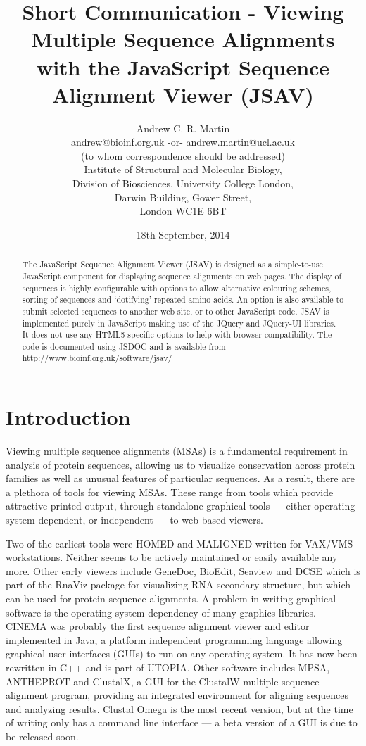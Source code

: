 \documentclass[12pt]{article}
\title{Short Communication - Viewing Multiple Sequence Alignments with
  the JavaScript Sequence Alignment Viewer (JSAV)}
\date{18th September, 2014}
\author{Andrew C. R. Martin\\
  andrew@bioinf.org.uk -or- andrew.martin@ucl.ac.uk \\
  (to whom correspondence should be addressed)\\
  Institute of Structural and Molecular Biology,\\
  Division of Biosciences, University College London,\\
  Darwin Building, Gower Street,\\
  London WC1E 6BT}
\begin{document}
\maketitle


\begin{abstract}
The JavaScript Sequence Alignment Viewer
(JSAV) is designed as a simple-to-use JavaScript component for
displaying sequence alignments on web pages.  The display of sequences
is highly configurable with options to allow alternative colouring
schemes, sorting of sequences and `dotifying' repeated amino acids. An
option is also available to submit selected sequences to another web
site, or to other JavaScript code. 
JSAV is implemented purely in JavaScript making use of the JQuery and
JQuery-UI libraries. It does not use any HTML5-specific options to help with
browser compatibility. The code is documented using JSDOC
and is available from \url{http://www.bioinf.org.uk/software/jsav/}
\end{abstract}


\section{Introduction}
Viewing multiple sequence alignments (MSAs) is a fundamental
requirement in analysis of protein sequences, allowing us to visualize
conservation across protein families as well as unusual features of
particular sequences. As a result, there are a plethora of tools for
viewing MSAs. These range from tools which provide attractive printed
output, through standalone graphical tools --- either operating-system
dependent, or independent --- to web-based viewers.

Two of the earliest tools were HOMED\cite{stockwell:homed} and
MALIGNED\cite{clark:maligned} written for VAX/VMS workstations.
Neither seems to be actively maintained or easily available any
more. Other early viewers include GeneDoc\cite{nicholas:genedoc},
BioEdit, Seaview\cite{galtier:seaview} and DCSE\cite{derijk:dcse}
which is part of the RnaViz package for visualizing RNA secondary
structure\cite{derijk:rnaviz}, but which can be used for protein
sequence alignments.  A problem in writing graphical software is the
operating-system dependency of many graphics libraries.
CINEMA\cite{parrysmith:cinema} was probably the first sequence
alignment viewer and editor implemented in Java, a platform
independent programming language allowing graphical user interfaces
(GUIs) to run on any operating system. It has now been rewritten in
C++ and is part of UTOPIA\cite{pettifer:utopia}. Other software
includes MPSA\cite{blanchet:mpsa}, ANTHEPROT\cite{deleage:antheprot}
and ClustalX\cite{thompson:clustalx}, a GUI for the ClustalW multiple
sequence alignment program, providing an integrated environment for
aligning sequences and analyzing results. Clustal Omega is the most
recent version, but at the time of writing only has a command line
interface --- a beta version of a GUI is due to be released soon.
\end{document}
